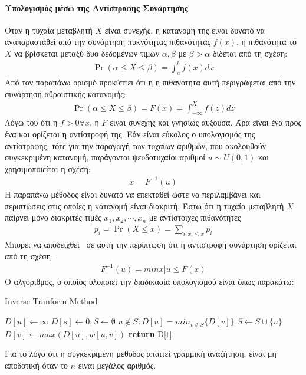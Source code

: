 \documentclass[12pt]{report}
\begin{document}
\paragraph{Υπολογισμός μέσω της Αντίστροφης Συναρτησης}
Όταν η τυχαία μεταβλητή \(X\) είναι συνεχής, η κατανομή της είναι δυνατό να αναπαρασταθεί από την συνάρτηση πυκνότητας πιθανότητας \(f(x)\). η πιθανότητα το \(X\) να βρίσκεται μεταξύ δυο δεδομένων τιμών \(\alpha, \beta\) με \(\beta>\alpha\) δίδεται από τη σχέση:
\begin{align*}
\Pr(\alpha \leq X \leq \beta)=\int_{a}^{b} f(x)dx
\end{align*}
Από τον παραπάνω ορισμό προκύπτει ότι η η πιθανότητα αυτή περιγράφεται από την συνάρτηση αθροιστικής κατανομής:
\begin{align*}
\Pr(\alpha \leq X \leq \beta)=F(x)=\int_{-\infty}^{X} f(z)dz
\end{align*}
Λόγω του ότι η \(f>0 \forall x\), η \(F\) είναι συνεχής και γνησίως αύξουσα. Άρα είναι ένα προς ένα και ορίζεται η αντίστροφή της. Εάν είναι εύκολος ο υπολογισμός της αντίστροφης, τότε για την παραγωγή των τυχαίων αριθμών, που ακολουθούν συγκεκριμένη κατανομή, παράγονται ψευδοτυχαίοι αριθμοί \(u \sim U(0, 1)\) και χρησιμοποιείται η σχέση:
\begin{align*}
x=F^{-1}(u)
\end{align*}
Η παραπάνω μέθοδος είναι δυνατό να επεκταθεί ώστε να περιλαμβάνει και περιπτώσεις στις οποίες η κατανομή είναι διακριτή. Έστω ότι η τυχαία μεταβλητή \(X\) παίρνει μόνο διακριτές τιμές \(x_1,x_2,\cdots,x_n\) με αντίστοιχες πιθανότητες
\begin{align*}
p_i=\Pr(X \leq x)=\sum_{i:x_i \leq x}^{} p_i
\end{align*}
Μπορεί να αποδειχθεί~\cite{book:04} σε αυτή την περίπτωση ότι η αντίστροφη συνάρτηση ορίζεται από τη σχέση:
\begin{align*}
F^{-1}(u)=min{x|u \leq F(x)}
\end{align*}
Ο αλγόριθμος, ο οποίος υλοποιεί την διαδικασία υπολογισμού είναι όπως παρακάτω:
\begin{algorithm}[h]
\caption{\textlatin{Inverse Tranform Method}}
\begin{algorithmic}[1]
      \State $D[u] \gets \infty$
  \EndFor
  \State $D[s] \gets 0 ; S \gets \emptyset$
      \State $u \notin S : D[u] = min_{v \notin S}\{D[v]\}$
    \State $S \gets S \cup \{u\}$
  \EndWhile
      \State $D[v] \gets max(D[u], w[u,v])$
    \EndIf
  \EndFor
  \State \textbf{return} D[t]
\EndProcedure
\end{algorithmic}
\end{algorithm}
Για το λόγο ότι η συγκεκριμένη μέθοδος απαιτεί γραμμική αναζήτηση, είναι μη αποδοτική όταν το \(n\) είναι μεγάλος αριθμός.
\end{document}
